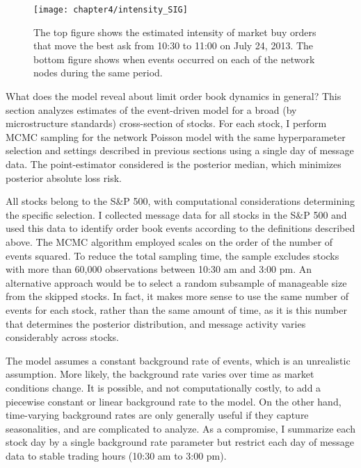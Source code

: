 \begin{figure}[t]
\small
\linespread{1}
\centering
\texttt{[image: chapter4/intensity\_SIG]}
\captionsetup{skip=-20pt, labelsep=colon, font=footnotesize, width=\linewidth}
\caption[Fitted intensity: SIG]{The top figure shows the estimated intensity of market buy orders that move the best ask from 10:30 to 11:00 on July 24, 2013. The bottom figure shows when events occurred on each of the network nodes during the same period.}
\label{fig:intensity_SIG}
\end{figure}


What does the model reveal about limit order book dynamics in general? This section analyzes estimates of the event-driven model for a broad (by microstructure standards) cross-section of stocks. For each stock, I perform MCMC sampling for the network Poisson model with the same hyperparameter selection and settings described in previous sections using a single day of message data. The point-estimator considered is the posterior median, which minimizes posterior absolute loss risk.

All stocks belong to the S\&P 500, with computational considerations determining the specific selection. I collected message data for all stocks in the S\&P 500 and used this data to identify order book events according to the definitions described above. The MCMC algorithm employed scales on the order of the number of events squared. To reduce the total sampling time, the sample excludes stocks with more than 60,000 observations between 10:30 am and 3:00 pm. An alternative approach would be to select a random subsample of manageable size from the skipped stocks. In fact, it makes more sense to use the same number of events for each stock, rather than the same amount of time, as it is this number that determines the posterior distribution, and message activity varies considerably across stocks.

The model assumes a constant background rate of events, which is an unrealistic assumption. More likely, the background rate varies over time as market conditions change. It is possible, and not computationally costly, to add a piecewise constant or linear background rate to the model. On the other hand, time-varying background rates are only generally useful if they capture seasonalities, and are complicated to analyze. As a compromise, I summarize each stock day by a single background rate parameter but restrict each day of message data to stable trading hours (10:30 am to 3:00 pm).

